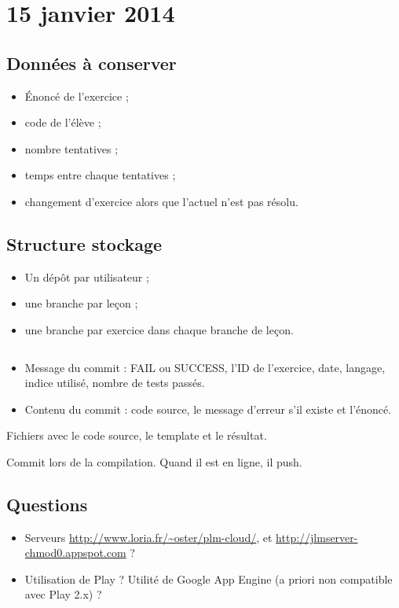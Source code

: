 \documentclass[12pt,a4paper]{article}
\author{HUGUENIN Cédric}
\begin{document}
\section{15 janvier 2014}
\subsection{Données à conserver}

\begin{itemize}
\item \'Enoncé de l'exercice ;
\item code de l'élève ;
\item nombre tentatives ;
\item temps entre chaque tentatives ;
\item changement d'exercice alors que l'actuel n'est pas résolu.
\end{itemize}

\subsection{Structure stockage}

\begin{itemize}
\item Un dépôt par utilisateur ;
\item une branche par leçon ;
\item une branche par exercice dans chaque branche de leçon.
\end{itemize}
$ $\\
\begin{itemize}
\item Message du commit : FAIL ou SUCCESS, l'ID de l'exercice, date, langage, indice utilisé, nombre de tests passés.
\item Contenu du commit : code source, le message d'erreur s'il existe et l'énoncé.
\end{itemize}

Fichiers avec le code source, le template et le résultat.

Commit lors de la compilation.
Quand il est en ligne, il push.

\subsection{Questions}

\begin{itemize}
\item Serveurs \url{http://www.loria.fr/~oster/plm-cloud/}, et \url{http://jlmserver-chmod0.appspot.com} ?
\item Utilisation de Play ? Utilité de Google App Engine (a priori non compatible avec Play 2.x) ?
\end{itemize}
\end{document}
